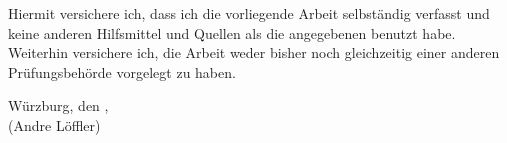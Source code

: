 \newpage

\vspace*{3cm}

Hiermit versichere ich, dass ich die vorliegende Arbeit selbständig verfasst und keine anderen Hilfsmittel und Quellen als die angegebenen benutzt habe. Weiterhin versichere ich, die Arbeit weder bisher noch gleichzeitig einer anderen Prüfungsbehörde vorgelegt zu haben.

\vspace{1.5cm}

Würzburg, den \underline{\hspace{3.5cm}}, \hspace*{0.5cm} \underline{\hspace{6.0cm}}\\
\hspace*{8.7cm}(Andre Löffler)
